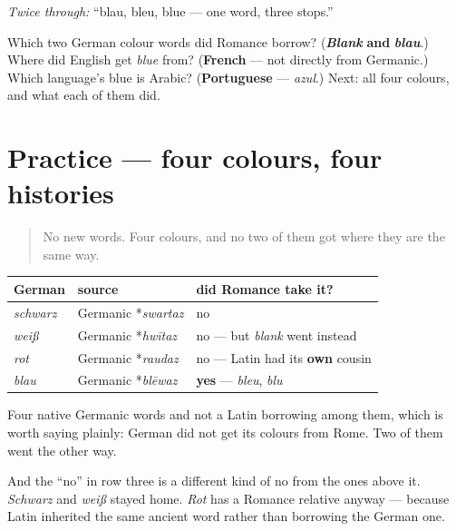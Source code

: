 \emph{Twice through:} \textquotedblleft{}blau, bleu, blue — one word, three stops.\textquotedblright{}

\begin{tcolorbox}[breakable,colback=teal!4,colframe=teal!35!black,title={Before you move on}]
Which two German colour words did Romance borrow? (\emph{\textbf{Blank}} \textbf{and} \emph{\textbf{blau}}.) Where did English get \emph{blue} from? (\textbf{French} — not directly from Germanic.) Which language's blue is Arabic? (\textbf{Portuguese} — \emph{azul}.) Next: all four colours, and what each of them did.
\end{tcolorbox}
\section[Practice]{Practice — four colours, four histories}

\label{lesson:GE-C13-rot-blau}



\begin{quote}
No new words. Four colours, and no two of them got where they are the same way.
\end{quote}

\begin{cousinweb}
\noindent
\begin{tabularx}{\linewidth}{@{}>{\raggedright\arraybackslash}X>{\raggedright\arraybackslash}X>{\raggedright\arraybackslash}X@{}}
\toprule
\textbf{German} & \textbf{source} & \textbf{did Romance take it?} \\
\midrule
\emph{schwarz} & Germanic *\emph{swartaz} & no \\
\emph{weiß} & Germanic *\emph{hwītaz} & no — but \emph{blank} went instead \\
\emph{rot} & Germanic *\emph{raudaz} & no — Latin had its \textbf{own} cousin \\
\emph{blau} & Germanic *\emph{blēwaz} & \textbf{yes} — \emph{bleu}, \emph{blu} \\
\bottomrule
\end{tabularx}

Four native Germanic words and not a Latin borrowing among them, which is worth saying plainly: German did not get its colours from Rome. Two of them went the other way.

And the \textquotedblleft{}no\textquotedblright{} in row three is a different kind of no from the ones above it. \emph{Schwarz} and \emph{weiß} stayed home. \emph{Rot} has a Romance relative anyway — because Latin inherited the same ancient word rather than borrowing the German one.
\end{cousinweb}

